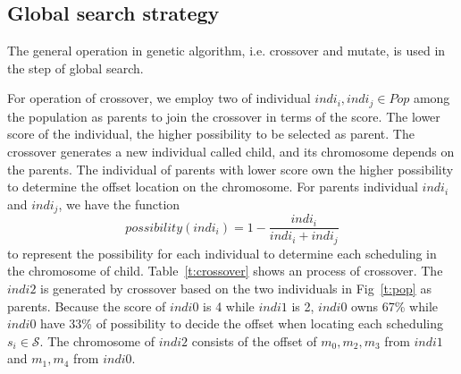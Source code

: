 \documentclass[journal]{IEEEtran}
\newcommand{\calS}{\mathcal{S}}
\theoremstyle{remark}
\begin{document}
\subsection{Global search strategy \label{s:glo}}

The general operation in genetic algorithm,
 i.e. crossover and mutate,
  is used in the step of global search. 

For operation of crossover,
 we employ two of individual $indi_i,indi_j\in Pop$ among the population as parents to join the crossover in terms of the score.
The lower score of the individual,
 the higher possibility to be selected as parent.
The crossover generates a new individual called child, and its chromosome depends on the parents.
The individual of parents with lower score own the higher possibility to determine the offset location on the chromosome.
For parents individual $indi_i$ and $indi_j$, we have the function
\begin{equation}
	possibility(indi_i)=1-\frac{indi_i}{indi_i+indi_j}
\end{equation}
to represent the possibility for each individual to determine each scheduling in the chromosome of child.
Table~\ref{t:crossover} shows an process of crossover.
The $indi2$ is generated by crossover based on the two individuals in Fig~\ref{t:pop} as parents.
Because the score of $indi0$ is 4 while $indi1$ is 2,
 $indi0$ owns 67\% while $indi0 $ have 33\% of possibility to decide the offset when locating each scheduling $s_i\in\calS$.
The chromosome of $indi2$ consists of the offset of $m_0,m_2,m_3$ from $indi1$ and $m_1,m_4$ from $indi0$.
\end{document}

